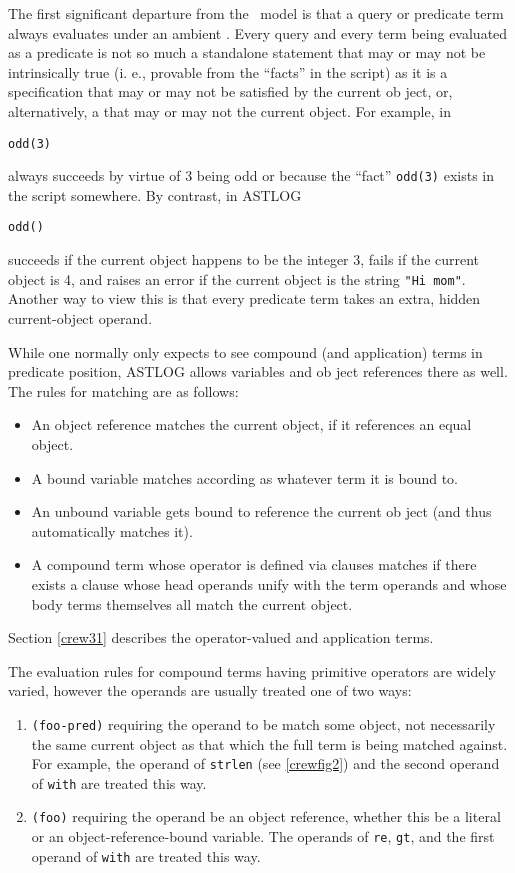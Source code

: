 The first significant departure from the \prolog\ model is that a query or
predicate term always evaluates under an ambient . Every
query and every term being evaluated as a predicate is not so much a standalone
statement that may or may not be intrinsically true (i. e., provable from the
``facts'' in the script) as it is a specification that may or may not be
satisfied by the current ob ject, or, alternatively, a  that may
or may not  the current object. For example, in \prolog
\begin{verbatim}
odd(3)
\end{verbatim}
always succeeds by virtue of 3 being odd or because the ``fact'' \verb|odd(3)|
exists in the script somewhere. By contrast, in ASTLOG
\begin{verbatim}
odd()
\end{verbatim}
succeeds if the current object happens to be the integer 3, fails if the current
object is 4, and raises an error if the current object is the string
\verb|"Hi mom"|. Another way to view this is that every predicate term takes an
extra, hidden current-object operand.

While one normally only expects to see compound (and application) terms in
predicate position, ASTLOG allows variables and ob ject references there as
well. The rules for matching are as follows:

\begin{itemize}
  \item 
An object reference matches the current object, if it references an equal
object.
  \item 
A bound variable matches according as whatever term it is bound to.
  \item 
An unbound variable gets bound to reference the current ob ject (and thus
automatically matches it).
\item 
A compound term whose operator is defined via clauses matches if there exists a
clause whose head operands unify with the term operands and whose body terms
themselves all match the current object.
\end{itemize}

Section \ref{crew31} describes the operator-valued and application terms.

The evaluation rules for compound terms having primitive operators are widely
varied, however the operands are usually treated one of two ways:

\begin{enumerate}
  \item 
\verb|(foo-pred)| requiring the operand to be match some object, not necessarily the same
current object as that which the full term is being matched against. For
example, the operand of \verb|strlen| (see \ref{crewfig2}) and the second
operand of \verb|with| are treated this way.
  \item 
\verb|(foo)| requiring the operand be an object reference, whether this be a
literal or an object-reference-bound variable. The operands of \verb|re|,
\verb|gt|, and the first operand of \verb|with| are treated this way.
\end{enumerate}

